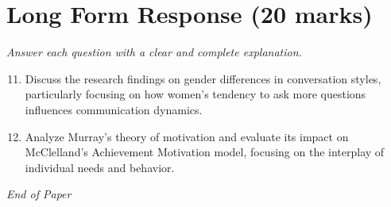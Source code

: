 \documentclass[12pt]{article}
\begin{document}
\section*{Long Form Response (20 marks)}
\textit{Answer each question with a clear and complete explanation.}
\begin{enumerate}[label=\arabic*.]
\setcounter{enumi}{10}
\item Discuss the research findings on gender differences in conversation styles, particularly focusing on how women's tendency to ask more questions influences communication dynamics.
\item Analyze Murray's theory of motivation and evaluate its impact on McClelland's Achievement Motivation model, focusing on the interplay of individual needs and behavior.
\end{enumerate}

\vfill
\noindent\textit{End of Paper}
\end{document}
